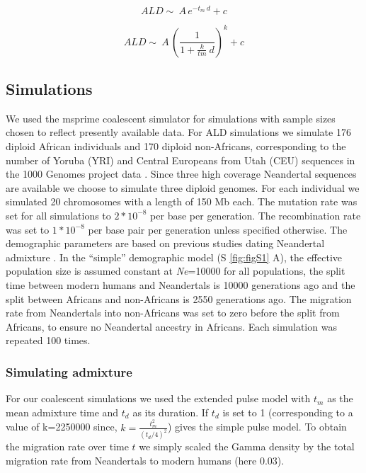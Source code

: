 \documentclass[]{article}
\begin{document}
\begin{equation}
\label{eq:simple_pulse_ccdf}
ALD \sim\ A\,e^{-t_m \:d}+c
\end{equation}

\begin{equation}
\label{eq:extended_pulse_ccdf}
ALD \sim\ A\,\left( \frac{1}{1 + \frac{k}{tm} \:d}\right) ^k+c
\end{equation}

\subsection{Simulations}\label{simulations}

We used the msprime coalescent simulator
\citep{kelleher_efficient_2016} for simulations with sample sizes
chosen to reflect presently available data. For ALD simulations we simulate 176 diploid
African individuals and 170 diploid non-Africans, corresponding to the
number of Yoruba (YRI) and Central Europeans from Utah (CEU)
sequences in the 1000 Genomes project data \citep{the_1000_genomes_project_consortium_global_2015}. Since three
high coverage Neandertal sequences are available \citep{prufer_complete_2013,prufer_high-coverage_2017,mafessoni_high_coverage_2020} we choose to
simulate three diploid genomes. For each individual we simulated 20
chromosomes with a length of 150 Mb each. The mutation rate was set for
all simulations to \(2*10^{-8}\) per base per generation. The
recombination rate was set to \(1*10^{-8}\) per base pair per generation
unless specified otherwise. The demographic parameters are based on
previous studies dating Neandertal admixture
\citep{sankararaman_date_2012,fu_genome_2014,moorjani_genetic_2016}. In
the ``simple'' demographic model (S \ref{fig:figS1} A), the effective
population size is assumed constant at \textit{Ne}=10000 for all populations, the
split time between modern humans and Neandertals is 10000 generations
ago and the split between Africans and non-Africans is 2550
generations ago. The migration rate from Neandertals into non-Africans
was set to zero before the split from Africans, to ensure no Neandertal
ancestry in Africans. Each simulation was repeated 100 times. 


\subsubsection{Simulating admixture}\label{Simulating the expanded pulse}

For our coalescent simulations we used the extended pulse model with $t_m$ as the mean admixture time and $t_d$ as its duration. If $t_d$ is set to 1 (corresponding to a value of k=2250000 since, $k=\frac{t_m^2}{(t_d/4)^2}$) gives the simple pulse model. To obtain the migration rate over time $t$ we simply scaled the Gamma density by the total migration rate from Neandertals to modern humans (here 0.03). 
\end{document}
